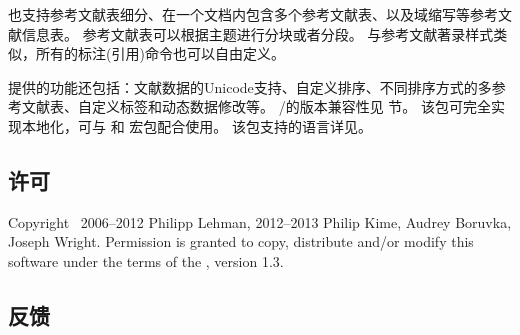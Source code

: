 
\biblatex 也支持参考文献表细分、在一个文档内包含多个参考文献表、以及域缩写等参考文献信息表。
参考文献表可以根据主题进行分块或者分段。
与参考文献著录样式类似，所有的标注(引用)命令也可以自由定义。


提供的功能还包括：文献数据的Unicode支持、自定义排序、不同排序方式的多参考文献表、自定义标签和动态数据修改等。
\biber/\biblatex 的版本兼容性见  节。
该包可完全实现本地化，可与  和  宏包配合使用。
该包支持的语言详见。


\subsection{许可}

Copyright \textcopyright\ 2006--2012 Philipp Lehman, 2012--2013 Philip Kime, Audrey Boruvka, Joseph Wright. Permission is granted to copy, distribute and\slash or modify this software under  the terms of the \lppl, version 1.3.

\subsection{反馈}
\label{int:feb}



